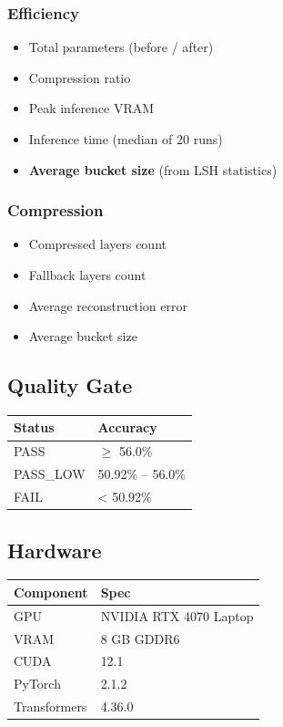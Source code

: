 \subsubsection{Efficiency}
\begin{itemize}
\item Total parameters (before / after)
\item Compression ratio
\item Peak inference VRAM
\item Inference time (median of 20 runs)
\item \textbf{Average bucket size} (from LSH statistics)

\end{itemize}
\subsubsection{Compression}
\begin{itemize}
\item Compressed layers count
\item Fallback layers count
\item Average reconstruction error
\item Average bucket size

\end{itemize}
\subsection{Quality Gate}

\begin{table}[H]
\centering
\small
\begin{tabular}{ll}
\toprule
\textbf{Status} & \textbf{Accuracy} \\
\midrule
PASS & $\ge$ 56.0\% \\
PASS\_LOW & 50.92\% -- 56.0\% \\
FAIL & < 50.92\% \\
\bottomrule
\end{tabular}
\end{table}

\subsection{Hardware}

\begin{table}[H]
\centering
\small
\begin{tabular}{ll}
\toprule
\textbf{Component} & \textbf{Spec} \\
\midrule
GPU & NVIDIA RTX 4070 Laptop \\
VRAM & 8 GB GDDR6 \\
CUDA & 12.1 \\
PyTorch & 2.1.2 \\
Transformers & 4.36.0 \\
\bottomrule
\end{tabular}
\end{table}

